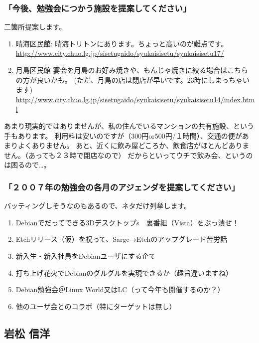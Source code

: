 \documentclass[mingoth,a4paper,twoside]{jsarticle}
\begin{document}
\subsubsection{「今後、勉強会につかう施設を提案してください」}

二箇所提案します。

\begin{enumerate}
 \item  晴海区民館:
 晴海トリトンにあります。ちょっと高いのが難点です。
 \url{http://www.city.chuo.lg.jp/sisetugaido/syukaisisetu/syukaisisetu17/}

 \item 月島区民館
 宴会を月島のお好み焼きや、もんじゃ焼きに絞る場合はこちらの方が良いかも。
	(ただ、月島の店は閉店が早いです。23時にしまっちゃいます)
	\url{http://www.city.chuo.lg.jp/sisetugaido/syukaisisetu/syukaisisetu14/index.html}
\end{enumerate}

あまり現実的ではありませんが、私の住んでいるマンションの共有施設、という手もあります。
利用料は安いのですが（300円or500円/１時間）、交通の便があまりよくありません。
あと、近くに飲み屋どころか、飲食店がほとんどありません。（あっても２３時で閉店なので）
だからといってウチで飲み会、というのは困るので…。


\subsubsection{「２００７年の勉強会の各月のアジェンダを提案してください」}

バッティングしそうなのもあるので、ネタだけ列挙します。

{\small
\begin{enumerate}
 \item Debianでだってできる3Dデスクトップs　裏番組（Vista）をぶっ潰せ！
 \item Etchリリース（仮）を祝って、Sarge→Etchのアップグレード苦労話
 \item 新入生・新入社員をDebianユーザにする企て
 \item 打ち上げ花火でDebianのグルグルを実現できるか（趣旨違いますね）
 \item Debian勉強会＠Linux World又はLC（って今年も開催するのか？）
 \item 他のユーザ会とのコラボ（特にターゲットは無し）
\end{enumerate}
}

\subsection{岩松 信洋}
\end{document}
